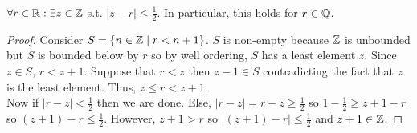 \documentclass[12pt]{extarticle}
\begin{document}
\begin{lemma} \label{approx} $\forall r \in \mathbb{R} : \exists z \in \mathbb{Z}$ s.t. $|z - r| \le \frac{1}{2}$. In particular, this holds for $r \in \mathbb{Q}$.
\end{lemma}
\begin{proof}
Consider $S = \{n \in \mathbb{Z} \mid r < n + 1 \}$. $S$ is non-empty because $\mathbb{Z}$ is unbounded but $S$ is bounded below by $r$ so by well ordering, $S$ has a least element $z$. Since $z \in S$, $r < z + 1$. Suppose that $r < z$ then $z - 1 \in S$ contradicting the fact that $z$ is the least element. Thus, $z \le r < z + 1$. \bigskip \\
Now if $|r - z| < \frac{1}{2}$ then we are done. Else, $|r - z| = r - z \ge \frac{1}{2}$ so $1 -  \frac{1}{2} \ge z + 1 - r$ so $(z + 1) - r \le \frac{1}{2}$. However, $z + 1 > r$ so $|(z + 1) - r| \le \frac{1}{2}$ and $z + 1 \in \mathbb{Z}$. 
\end{proof}
\end{document}
